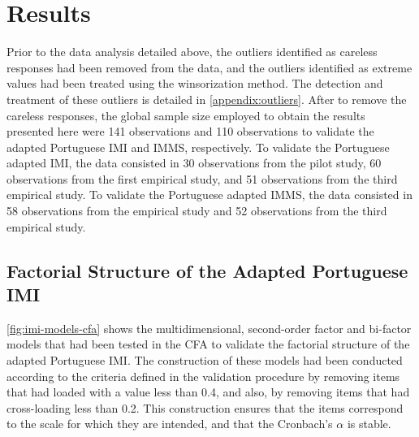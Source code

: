 \section{Results}
\label{sec:validation-motivation-surveys-results}

Prior to the data analysis detailed above, the outliers identified as careless responses had been removed from the data, and the outliers identified as extreme values had been treated using the winsorization method. The detection and treatment of these outliers is detailed in \autoref{appendix:outliers}.
After to remove the careless responses, the global sample size employed to obtain the results presented here were 141 observations and 110 observations to validate the adapted Portuguese IMI and IMMS, respectively. To validate the Portuguese adapted IMI, the data consisted in 30 observations from the pilot study, 60 observations from the first empirical study, and 51 observations from the third empirical study. To validate the Portuguese adapted IMMS, the data consisted in 58 observations from the empirical study and 52 observations from the third empirical study.

\subsection{Factorial Structure of the Adapted Portuguese IMI}

\autoref{fig:imi-models-cfa} shows the multidimensional, second-order factor and bi-factor models that had been tested in the CFA to validate the factorial structure of the adapted Portuguese IMI. The construction of these models had been conducted according to the criteria defined in the validation procedure by removing items that had loaded with a value less than 0.4, and also, by removing items that had cross-loading less than 0.2. This construction ensures that the items correspond to the scale for which they are intended, and that the Cronbach’s $\alpha$ is stable.

